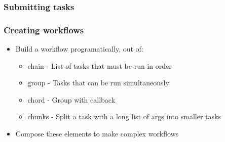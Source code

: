 \documentclass{beamer}
\begin{document}
\begin{frame}
  \frametitle{Submitting tasks}
\end{frame}


\begin{frame}
  \frametitle{Creating workflows}
  \begin{itemize}
  \item Build a workflow programatically, out of:
    \begin{itemize}
  \item chain - List of tasks that must be run in order
  \item group - Tasks that can be run simultaneously
  \item chord - Group with callback
  \item chunks - Split a task with a long list of args into smaller tasks
    \end{itemize}
    \item Compose these elements to make complex workflows
  \end{itemize}
\end{frame}
\end{document}
